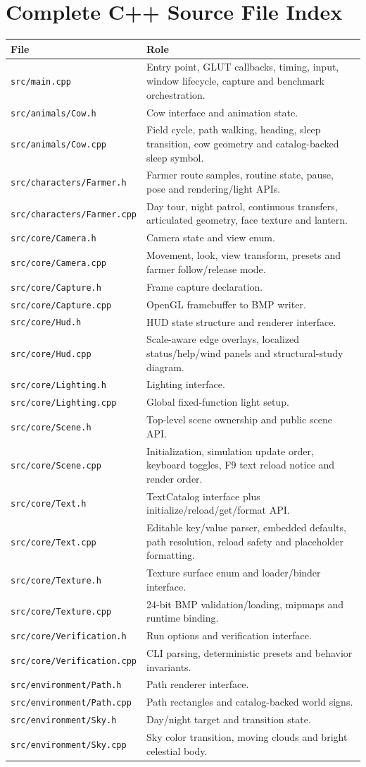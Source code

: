\documentclass[11pt,a4paper,openany]{book}
\newcommand{\file}[1]{\nolinkurl{#1}}
\newcommand{\pathrow}[2]{\file{#1} & #2\\}
\begin{document}
\chapter{Complete C++ Source File Index}
\begin{longtable}{@{}p{}p{}@{}}
	\toprule
	File & Role \\
	\midrule
	\endhead
	\pathrow{src/main.cpp}{Entry point, GLUT callbacks, timing, input, window lifecycle, capture and benchmark orchestration.}
	\pathrow{src/animals/Cow.h}{Cow interface and animation state.}
	\pathrow{src/animals/Cow.cpp}{Field cycle, path walking, heading, sleep transition, cow geometry and catalog-backed sleep symbol.}
	\pathrow{src/characters/Farmer.h}{Farmer route samples, routine state, pause, pose and rendering/light APIs.}
	\pathrow{src/characters/Farmer.cpp}{Day tour, night patrol, continuous transfers, articulated geometry, face texture and lantern.}
	\pathrow{src/core/Camera.h}{Camera state and view enum.}
	\pathrow{src/core/Camera.cpp}{Movement, look, view transform, presets and farmer follow/release mode.}
	\pathrow{src/core/Capture.h}{Frame capture declaration.}
	\pathrow{src/core/Capture.cpp}{OpenGL framebuffer to BMP writer.}
	\pathrow{src/core/Hud.h}{HUD state structure and renderer interface.}
	\pathrow{src/core/Hud.cpp}{Scale-aware edge overlays, localized status/help/wind panels and structural-study diagram.}
	\pathrow{src/core/Lighting.h}{Lighting interface.}
	\pathrow{src/core/Lighting.cpp}{Global fixed-function light setup.}
	\pathrow{src/core/Scene.h}{Top-level scene ownership and public scene API.}
	\pathrow{src/core/Scene.cpp}{Initialization, simulation update order, keyboard toggles, F9 text reload notice and render order.}
	\pathrow{src/core/Text.h}{TextCatalog interface plus initialize/reload/get/format API.}
	\pathrow{src/core/Text.cpp}{Editable key/value parser, embedded defaults, path resolution, reload safety and placeholder formatting.}
	\pathrow{src/core/Texture.h}{Texture surface enum and loader/binder interface.}
	\pathrow{src/core/Texture.cpp}{24-bit BMP validation/loading, mipmaps and runtime binding.}
	\pathrow{src/core/Verification.h}{Run options and verification interface.}
	\pathrow{src/core/Verification.cpp}{CLI parsing, deterministic presets and behavior invariants.}
	\pathrow{src/environment/Path.h}{Path renderer interface.}
	\pathrow{src/environment/Path.cpp}{Path rectangles and catalog-backed world signs.}
	\pathrow{src/environment/Sky.h}{Day/night target and transition state.}
	\pathrow{src/environment/Sky.cpp}{Sky color transition, moving clouds and bright celestial body.}

\end{longtable}
\end{document}
